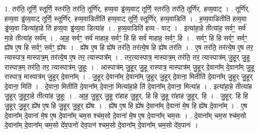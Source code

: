 \documentclass[17pt]{extarticle}
\begin{document}
1. तर॑ति॒ तूर्णि॒ स्तूर्णि॒ स्तर॑ति॒ तर॑ति॒ तूर्णि॑र्. हव्य॒वा ड्ढ॑व्य॒वाट् तूर्णि॒ स्तर॑ति॒ तर॑ति॒ तूर्णि॑र्. हव्य॒वाट् । . तूर्णि॑र्. हव्य॒वा ड्ढ॑व्य॒वाट् तूर्णि॒ स्तूर्णि॑र्. हव्य॒वाडितीति॑ हव्य॒वाट् तूर्णि॒ स्तूर्णि॑र्. हव्य॒वाडिति॑ । . ह॒व्य॒वाडितीति॑ हव्य॒वा ड्ढ॑व्य॒वा डित्या॑हा॒हे ति॑ हव्य॒वा ड्ढ॑व्य॒वा डित्या॑ह । . ह॒व्य॒वाडिति॑ हव्य - वाट् । . इत्या॑हा॒हे तीत्या॑ह॒ सर्वꣳ॒॒ सर्व॑ मा॒हे तीत्या॑ह॒ सर्व᳚म् । . आ॒ह॒ सर्वꣳ॒॒ सर्व॑ माहाह॒ सर्वꣳ॒॒ हि हि सर्व॑ माहाह॒ सर्वꣳ॒॒ हि । . सर्वꣳ॒॒ हि हि सर्वꣳ॒॒ सर्वꣳ॒॒ ह्ये॑ष ए॒ष हि सर्वꣳ॒॒ सर्वꣳ॒॒ ह्ये॑षः । . ह्ये॑ष ए॒ष हि ह्ये॑ष तर॑ति॒ तर॑त्ये॒ष हि ह्ये॑ष तर॑ति । . ए॒ष तर॑ति॒ तर॑त्ये॒ष ए॒ष तर॒ त्यास्पात्र॒ मास्पात्र॒म् तर॑त्ये॒ष ए॒ष तर॒ त्यास्पात्र᳚म् । . तर॒त्यास्पात्र॒ मास्पात्र॒म् तर॑ति॒ तर॒ त्यास्पात्र॑म् जु॒हूर् जु॒हू रास्पात्र॒म् तर॑ति॒ तर॒ त्यास्पात्र॑म् जु॒हूः । . आस्पात्र॑म् जु॒हूर् जु॒हू रास्पात्र॒ मास्पात्र॑म् जु॒हूर् दे॒वाना᳚म् दे॒वाना᳚म् जु॒हू रास्पात्र॒ मास्पात्र॑म् जु॒हूर् दे॒वाना᳚म् । . जु॒हूर् दे॒वाना᳚म् दे॒वाना᳚म् जु॒हूर् जु॒हूर् दे॒वाना॒ मितीति॑ दे॒वाना᳚म् जु॒हूर् जु॒हूर् दे॒वाना॒ मिति॑ । . दे॒वाना॒ मितीति॑ दे॒वाना᳚म् दे॒वाना॒ मित्या॑हा॒हे ति॑ दे॒वाना᳚म् दे॒वाना॒ मित्या॑ह । . इत्या॑हा॒हे तीत्या॑ह जु॒हूर् जु॒हूरा॒हे तीत्या॑ह जु॒हूः । . आ॒ह॒ जु॒हूर् जु॒हू रा॑हाह जु॒हूर्. हि हि जु॒हू रा॑हाह जु॒हूर्. हि । . जु॒हूर्. हि हि जु॒हूर् जु॒हूर् ह्ये॑ष ए॒ष हि जु॒हूर् जु॒हूर् ह्ये॑षः । . ह्ये॑ष ए॒ष हि ह्ये॑ष दे॒वाना᳚म् दे॒वाना॑ मे॒ष हि ह्ये॑ष दे॒वाना᳚म् । . ए॒ष दे॒वाना᳚म् दे॒वाना॑ मे॒ष ए॒ष दे॒वाना᳚म् चम॒स श्च॑म॒सो दे॒वाना॑ मे॒ष ए॒ष दे॒वाना᳚म् चम॒सः । . दे॒वाना᳚म् चम॒स श्च॑म॒सो दे॒वाना᳚म् दे॒वाना᳚म् चम॒सो दे॑व॒पानो॑ देव॒पान॑ श्चम॒सो दे॒वाना᳚म् दे॒वाना᳚म् चम॒सो दे॑व॒पानः॑ । \newline
\end{document}
